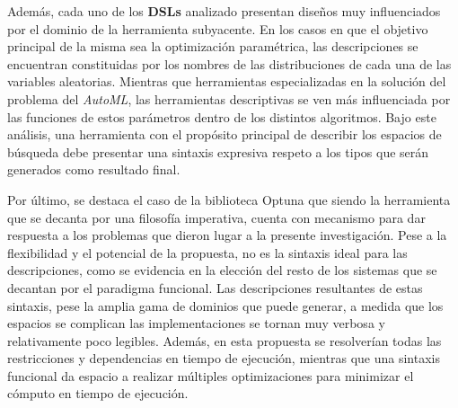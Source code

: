 Además, cada uno de los {\bf DSLs} analizado presentan diseños muy influenciados
por el dominio de la herramienta subyacente. En los casos en que el objetivo
principal de la misma sea la optimización paramétrica, las descripciones se
encuentran constituidas por los nombres de las distribuciones de cada una de
las variables aleatorias. Mientras que herramientas especializadas en la solución
del problema del {\it AutoML}, las herramientas descriptivas se ven más influenciada
por las funciones de estos parámetros dentro de los distintos algoritmos. Bajo este
análisis, una herramienta con el propósito principal de describir los espacios de
búsqueda debe presentar una sintaxis expresiva
respeto a los tipos que serán generados como resultado final.

Por último, se destaca el caso de la biblioteca Optuna que siendo la herramienta
que se decanta por una filosofía imperativa, cuenta con mecanismo para dar respuesta
a los problemas que dieron lugar a la presente investigación. Pese a la flexibilidad
y el potencial de la propuesta, no es la sintaxis ideal para las descripciones, como se
evidencia en la elección del resto de los sistemas que se decantan por el paradigma
funcional. Las descripciones resultantes de estas sintaxis, pese la amplia gama de
dominios que puede generar, a medida que los espacios se complican las implementaciones
se tornan muy verbosa y relativamente poco legibles. Además, en esta propuesta se
resolverían todas las restricciones y dependencias en tiempo de ejecución, mientras
que una sintaxis funcional da espacio a realizar múltiples optimizaciones para
minimizar el cómputo en tiempo de ejecución.
